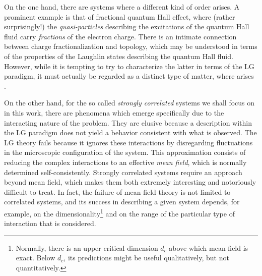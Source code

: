 On the one hand, there are systems where a different kind of order arises.
A prominent example is that of fractional quantum Hall effect, where (rather surprisingly!) the \emph{quasi-particles} describing the excitations of the quantum Hall fluid carry \emph{fractions} of the electron charge.
There is an intimate connection between charge fractionalization and topology, which may be understood in terms of the properties of the Laughlin states describing the quantum Hall fluid. However, while it is tempting to try to characterize the latter in terms of the \acs{LG} paradigm, it must actually be regarded as a distinct type of matter, where  arises \cite{wen_topological_1990}.

On the other hand, for the so called \emph{strongly correlated} systems we shall focus on in this work, there are phenomena which emerge specifically due to the interacting nature of the problem.
They are elusive because a description within the \acs{LG} paradigm does not yield a behavior consistent with what is observed.
The \acs{LG} theory fails because it ignores these interactions by disregarding fluctuations in the microscopic configuration of the system.
This approximation consists of reducing the complex interactions to an effective \emph{mean field}, which is normally determined self-consistently.
Strongly correlated systems require an approach beyond mean field, which makes them both extremely interesting and notoriously difficult to treat.
In fact, the failure of mean field theory is not limited to correlated systems, and its success in describing a given system depends, for example, on the dimensionality\footnote{Normally, there is an upper critical dimension $d_c$ above which mean field is exact. Below $d_c$, its predictions might be useful qualitatively, but not quantitatively.} and on the range of the particular type of interaction that is considered.

